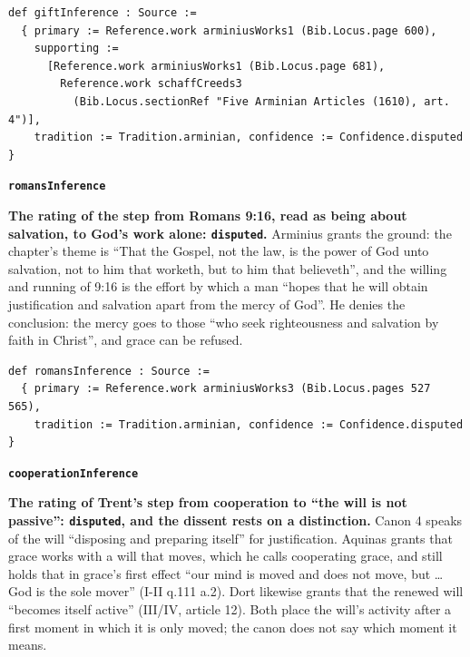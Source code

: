 \documentclass[11pt]{article}
\begin{document}
{\small\begin{verbatim}
def giftInference : Source :=
  { primary := Reference.work arminiusWorks1 (Bib.Locus.page 600),
    supporting :=
      [Reference.work arminiusWorks1 (Bib.Locus.page 681),
        Reference.work schaffCreeds3
          (Bib.Locus.sectionRef "Five Arminian Articles (1610), art. 4")],
    tradition := Tradition.arminian, confidence := Confidence.disputed }
\end{verbatim}}
\par\medskip\noindent\textbf{\texttt{romans\allowbreak{}Inference}}\par\nobreak\noindent
\textbf{The rating of the step from Romans 9:16, read as being about salvation, to God’s work alone: \texttt{disputed}.} Arminius grants the ground: the chapter’s theme is “That the Gospel, not the law, is the power of God unto salvation, not to him that worketh, but to him that believeth”, and the willing and running of 9:16 is the effort by which a man “hopes that he will obtain justification and salvation apart from the mercy of God”. He denies the conclusion: the mercy goes to those “who seek righteousness and salvation by faith in Christ”, and grace can be refused.

{\small\begin{verbatim}
def romansInference : Source :=
  { primary := Reference.work arminiusWorks3 (Bib.Locus.pages 527 565),
    tradition := Tradition.arminian, confidence := Confidence.disputed }
\end{verbatim}}
\par\medskip\noindent\textbf{\texttt{cooperation\allowbreak{}Inference}}\par\nobreak\noindent
\textbf{The rating of Trent’s step from cooperation to “the will is not passive”: \texttt{disputed}, and the dissent rests on a distinction.} Canon 4 speaks of the will “disposing and preparing itself” for justification. Aquinas grants that grace works with a will that moves, which he calls cooperating grace, and still holds that in grace’s first effect “our mind is moved and does not move, but … God is the sole mover” (I-II q.111 a.2). Dort likewise grants that the renewed will “becomes itself active” (III/IV, article 12). Both place the will’s activity after a first moment in which it is only moved; the canon does not say which moment it means.
\end{document}
